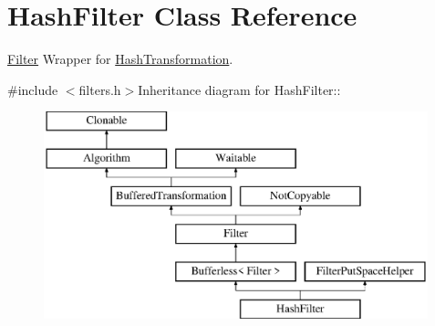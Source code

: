 \hypertarget{class_hash_filter}{
\section{HashFilter Class Reference}
\label{class_hash_filter}
}


\hyperlink{class_filter}{Filter} Wrapper for \hyperlink{class_hash_transformation}{HashTransformation}.  


{\ttfamily \#include $<$filters.h$>$}Inheritance diagram for HashFilter::\begin{figure}[H]
\begin{center}
\leavevmode
\includegraphics[height=6cm]{class_hash_filter}
\end{center}
\end{figure}
